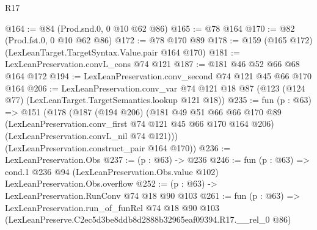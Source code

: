\begin{lexlean}{R17}
\begin{coremodule}
@164 := @84 (Prod.snd.{0, 0} @10 @62 @86)
@165 := @78 @164
@170 := @82 (Prod.fst.{0, 0} @10 @62 @86)
@172 := @78 @170 @89
@178 := @159 (@165 @172) (LexLeanTarget.TargetSyntax.Value.pair @164 @170)
@181 := LexLeanPreservation.convL_cons @74 @121
@187 := @181 @46 @52 @66 @68 @164 @172
@194 := LexLeanPreservation.conv_second @74 @121 @45 @66 @170 @164
@206 := LexLeanPreservation.conv_var
    @74
    @121
    @18
    @87
    (@123 (@124 @77) (LexLeanTarget.TargetSemantics.lookup @121 @18))
@235 := fun (p : @63) =>
  @151
    (@178
      (@187
        (@194 @206)
        (@181
          @49
          @51
          @66
          @66
          @170
          @89
          (LexLeanPreservation.conv_first @74 @121 @45 @66 @170 @164 @206)
          (LexLeanPreservation.convL_nil @74 @121)))
      (LexLeanPreservation.construct_pair @164 @170))
@236 := LexLeanPreservation.Obs
@237 := (p : @63) -> @236
@246 := fun (p : @63) =>
  cond.{1} @236 @94 (LexLeanPreservation.Obs.value @102) LexLeanPreservation.Obs.overflow
@252 := (p : @63) -> LexLeanPreservation.RunConv @74 @18 @90 @103
@261 := fun (p : @63) =>
  LexLeanPreservation.run_of_funRel
    @74
    @18
    @90
    @103
    (LexLeanPreserve.C2ec5d3be8ddb8d2888b32965eaf09394.R17.__rel_0 @86)
\end{coremodule}
\end{lexlean}
